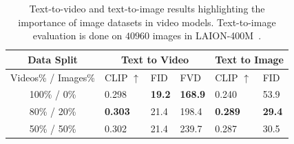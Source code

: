
\begin{table}
\small
\caption{Text-to-video and text-to-image results highlighting the importance of image datasets in video models. Text-to-image evaluation is done on $40960$ images in LAION-400M~\cite{schuhmann2021laion}.
}
\vspace{-.3cm}
\label{tab:video_image}
\centering
\begin{tabular}{c|lll|ll}
Data Split & \multicolumn{3}{|c|}{Text to Video} & \multicolumn{2}{c}{Text to Image} \\\hline\hline
Videos\% / Images\% & CLIP $\uparrow$ & FID  & FVD  & CLIP $\uparrow$ & FID  \\\hline
100\% / 0\% & 0.298 & \textbf{19.2} & \textbf{168.9} & 0.240 & 53.9\\
80\% / 20\% & \textbf{0.303} & 21.4 & 198.4 & \textbf{0.289} & \textbf{29.4}\\
50\% / 50\%& 0.302 & 21.4 & 239.7 & 0.287 & 30.5\\             
\end{tabular}

\end{table}
